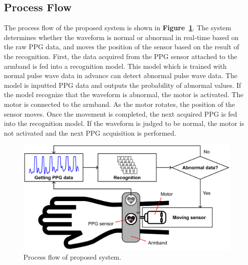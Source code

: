 \documentclass[sigconf]{acmart}
\newcommand\figref[1]{\textbf{Figure~\ref{fig:#1}}}
\begin{document}
\subsection{Process Flow}
The process flow of the proposed system is shown in \figref{system}. The system determines whether the waveform is normal or abnormal in real-time based on the raw PPG data, and moves the position of the sensor based on the result of the recognition. First, the data acquired from the PPG sensor attached to the armband is fed into a recognition model. This model which is trained with normal pulse wave data in advance can detect abnormal pulse wave data. The model is inputted PPG data and outputs the probability of abnormal values. If the model recognize that the waveform is abnormal, the motor is activated. The motor is connected to the armband. As the motor rotates, the position of the sensor moves. Once the movement is completed, the next acquired PPG is fed into the recognition model. If the waveform is judged to be normal, the motor is not activated and the next PPG acquisition is performed.

\begin{figure}[!t]
  \centering
  \includegraphics[width=1\linewidth]{figures/system.eps}
  \caption{Process flow of proposed system.}
  \label{fig:system}
\end{figure}
\end{document}
